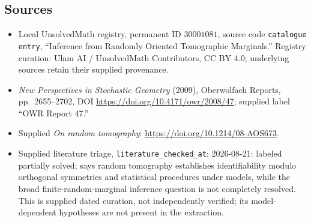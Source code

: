 \documentclass[11pt]{article}
\begin{document}
\subsection{Sources}
\begin{itemize}
\item Local UnsolvedMath registry, permanent ID \(30001081\), source code \texttt{catalogue entry}, ``Inference from Randomly Oriented Tomographic Marginals.'' Registry curation: Ulam AI / UnsolvedMath Contributors, CC BY 4.0; underlying sources retain their supplied provenance.
\item \emph{New Perspectives in Stochastic Geometry} (2009), Oberwolfach Reports, pp.\ 2655--2702, DOI \url{https://doi.org/10.4171/owr/2008/47}; supplied label ``OWR Report 47.''
\item Supplied \emph{On random tomography}: \url{https://doi.org/10.1214/08-AOS673}.
\item Supplied literature triage, \texttt{literature\_checked\_at}: 2026-08-21: labeled partially solved; says random tomography establishes identifiability modulo orthogonal symmetries and statistical procedures under models, while the broad finite-random-marginal inference question is not completely resolved. This is supplied dated curation, not independently verified; its model-dependent hypotheses are not present in the extraction.
\end{itemize}
\end{document}
